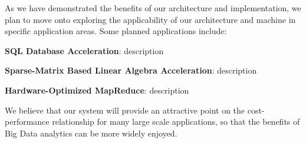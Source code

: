 \documentclass[pageno]{jpaper}
\begin{document}
As we have demonstrated the benefits of our architecture and implementation, we
plan to move onto exploring the applicability of our architecture and machine in
specific application areas. Some planned applications include:

\textbf{SQL Database Acceleration}: description

\textbf{Sparse-Matrix Based Linear Algebra Acceleration}: description

\textbf{Hardware-Optimized MapReduce}: description

We believe that our system will provide an attractive point on the
cost-performance relationship for many large scale applications, so that the
benefits of Big Data analytics can be more widely enjoyed.





\end{document}
